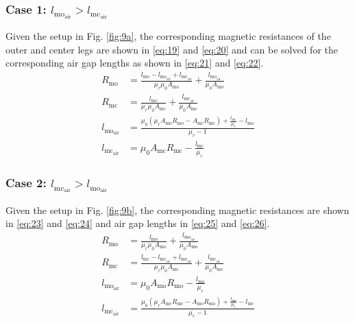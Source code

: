 \documentclass[lettersize,journal]{IEEEtran}
\begin{document}
\subsubsection*{\textup{Case 1: $l_{\mathrm{mo}_{\mathrm{air}}} > l_{\mathrm{mc}_{\mathrm{air}}}$}}
Given the setup in Fig. \ref{fig:9a}, the corresponding magnetic resistances of the outer and center legs are shown in \eqref{eq:19} and \eqref{eq:20} and can be solved for the corresponding air gap lengths as shown in \eqref{eq:21} and \eqref{eq:22}.
\begin{align}
R_{\mathrm{mo}} &= \frac{l_{\mathrm{mo}} - l_{\mathrm{mo}_{\mathrm{air}}} + l_{\mathrm{mc}_{\mathrm{air}}}}{\mu_r \mu_0 A_{\mathrm{mo}}} + \frac{l_{\mathrm{mo}_{\mathrm{air}}}}{\mu_0 A_{\mathrm{mo}}} \label{eq:19}\\
R_{\mathrm{mc}} &= \frac{l_{\mathrm{mc}}}{\mu_r \mu_0 A_{\mathrm{mc}}} + \frac{l_{\mathrm{mc}_{\mathrm{air}}}}{\mu_0 A_{\mathrm{mc}}} \label{eq:20}\\
l_{\mathrm{mo}_{\mathrm{air}}} &= \frac{\mu_0 (\mu_r A_{\mathrm{mo}} R_{\mathrm{mo}} - A_{\mathrm{mc}} R_{\mathrm{mc}}) + \frac{l_{\mathrm{mc}}}{\mu_r} - l_{\mathrm{mo}}}{\mu_r - 1} \label{eq:21}\\
l_{\mathrm{mc}_{\mathrm{air}}} &= \mu_0 A_{\mathrm{mc}} R_{\mathrm{mc}} - \frac{l_{\mathrm{mc}}}{\mu_r} \label{eq:22}
\end{align}

\subsubsection*{\textup{Case 2: $l_{\mathrm{mc}_{\mathrm{air}}} > l_{\mathrm{mo}_{\mathrm{air}}}$}}
Given the setup in Fig. \ref{fig:9b}, the corresponding magnetic resistances are shown in \eqref{eq:23} and \eqref{eq:24} and air gap lengths in \eqref{eq:25} and \eqref{eq:26}.
\begin{align}
R_{\mathrm{mo}} &= \frac{l_{\mathrm{mo}}}{\mu_r \mu_0 A_{\mathrm{mo}}} + \frac{l_{\mathrm{mo}_{\mathrm{air}}}}{\mu_0 A_{\mathrm{mo}}} \label{eq:23}\\
R_{\mathrm{mc}} &= \frac{l_{\mathrm{mc}} - l_{\mathrm{mc}_{\mathrm{air}}} + l_{\mathrm{mo}_{\mathrm{air}}}}{\mu_r \mu_0 A_{\mathrm{mc}}} + \frac{l_{\mathrm{mc}_{\mathrm{air}}}}{\mu_0 A_{\mathrm{mc}}} \label{eq:24}\\
l_{\mathrm{mo}_{\mathrm{air}}} &= \mu_0 A_{\mathrm{mo}} R_{\mathrm{mo}} - \frac{l_{\mathrm{mo}}}{\mu_r} \label{eq:25}\\
l_{\mathrm{mc}_{\mathrm{air}}} &= \frac{\mu_0 (\mu_r A_{\mathrm{mc}} R_{\mathrm{mc}} - A_{\mathrm{mo}} R_{\mathrm{mo}}) + \frac{l_{\mathrm{mo}}}{\mu_r} - l_{\mathrm{mc}}}{\mu_r - 1} \label{eq:26}
\end{align}
\end{document}
